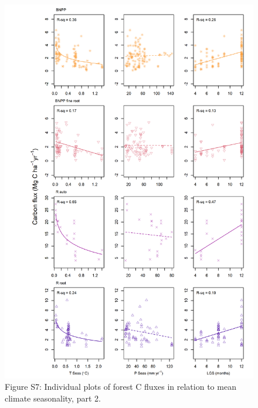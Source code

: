 \documentclass[
]{article}
\begin{document}
\newpage
\begin{figure}[H]
\includegraphics[width=1\linewidth]{tables_figures/grid_plots_seasonality4} \caption{Figure S7: Individual plots of forest C fluxes in relation to mean climate seasonality, part 2.}\label{fig:unnamed-chunk-15}
\end{figure}
\end{document}
